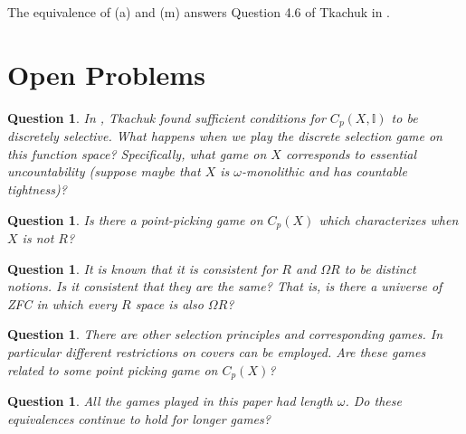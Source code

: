 \documentclass{amsart}
\theoremstyle{plain}
\newtheorem{question}[theorem]{Question}
\theoremstyle{definition}
\theoremstyle{remark}
\theoremstyle{plain}
\theoremstyle{definition}
\theoremstyle{remark}
\begin{document}
The equivalence of (a) and (m) answers Question 4.6 of Tkachuk in \cite{Tkachuk3}.

\section{Open Problems}

\begin{question}
 In \cite{Tkachuk2}, Tkachuk found sufficient conditions for \(C_p(X,\mathbb{I})\) to be discretely selective. What happens when we play the discrete selection game on this function space?
 Specifically, what game on \(X\) corresponds to essential uncountability (suppose maybe that \(X\) is \(\omega\)-monolithic and has countable tightness)? 
\end{question}

\begin{question}
 Is there a point-picking game on \(C_p(X)\) which characterizes when \(X\) is not \(R\)?
\end{question}

\begin{question}
 It is known that it is consistent for \(R\) and \(\Omega R\) to be distinct notions.
 Is it consistent that they are the same?
 That is, is there a universe of ZFC in which every \(R\) space is also \(\Omega R\)?
\end{question}

\begin{question}
 There are other selection principles and corresponding games.
 In particular different restrictions on covers can be employed.
 Are these games related to some point picking game on \(C_p(X)\)?
\end{question}

\begin{question}
 All the games played in this paper had length \(\omega\).
 Do these equivalences continue to hold for longer games?
\end{question}




\end{document}
